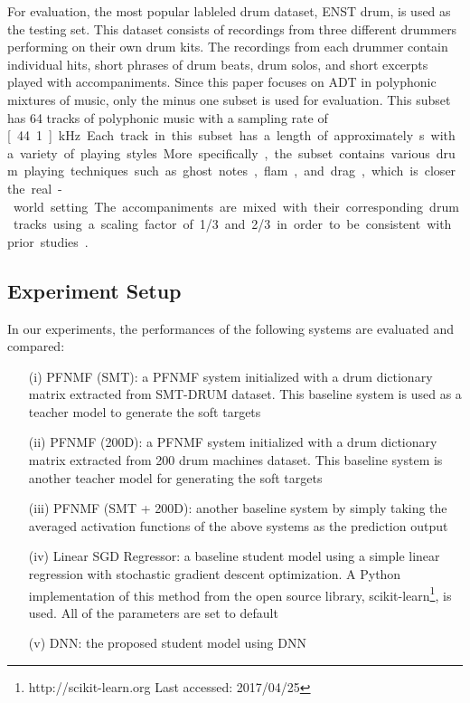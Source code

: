 \documentclass{article}
\begin{document}
For evaluation, the most popular lableled drum dataset, ENST drum\cite{Gillet2006}, is used as the testing set. This dataset consists of recordings from three different drummers performing on their own drum kits. The recordings from each drummer contain individual hits, short phrases of drum beats, drum solos, and short excerpts played with accompaniments. Since this paper focuses on ADT in polyphonic mixtures of music, only the minus one subset is used for evaluation. This subset has 64 tracks of polyphonic music with a sampling rate of \unit[44.1]{kHz}. Each track in this subset has a length of approximately \unit[70]{s} with a variety of playing styles. More specifically, the subset contains various drum playing techniques such as ghost notes, flam, and drag, which is closer the real-world setting. The accompaniments are mixed with their corresponding drum tracks using a scaling factor of 1/3 and 2/3 in order to be consistent with prior studies \cite{Paulus2009a, Wu2015a, Southall2016}.




\subsection{Experiment Setup}
In our experiments, the performances of the following systems are evaluated and compared: 
\begin{itemize}
\item[(i)] PFNMF (SMT): a PFNMF system initialized with a drum dictionary matrix extracted from SMT-DRUM dataset. This baseline system is used as a teacher model to generate the soft targets
\item[(ii)] PFNMF (200D): a PFNMF system initialized with a drum dictionary matrix extracted from 200 drum machines dataset. This baseline system is another teacher model for generating the soft targets
\item[(iii)] PFNMF (SMT + 200D): another baseline system by simply taking the averaged activation functions of the above systems as the prediction output
\item[(iv)] Linear SGD Regressor: a baseline student model using a simple linear regression with stochastic gradient descent optimization. A Python implementation of this method from the open source library, scikit-learn\footnote{http://scikit-learn.org Last accessed: 2017/04/25}, is used. All of the parameters are set to default
\item[(v)] DNN: the proposed student model using DNN
\end{itemize}
\end{document}
